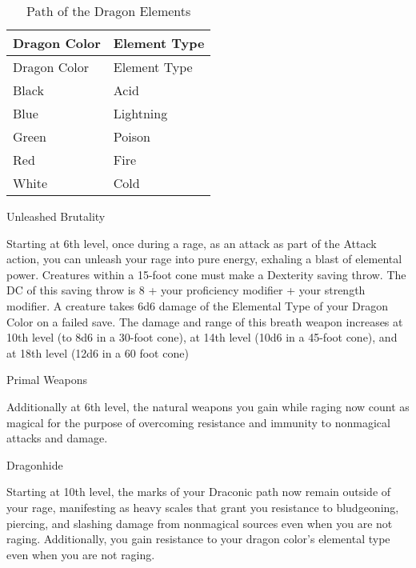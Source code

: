 \begin{longtable}[]{@{}
  >{\raggedright\arraybackslash}p{}
  >{\raggedright\arraybackslash}p{}@{}}
\caption{Path of the Dragon
Elements}\label{dreadnought-path-of-the-dragon-table}\tabularnewline
\toprule\noalign{}
\begin{minipage}[b]{\linewidth}\raggedright
Dragon Color
\end{minipage} & \begin{minipage}[b]{\linewidth}\raggedright
Element Type
\end{minipage} \\
\midrule\noalign{}
\endfirsthead
\toprule\noalign{}
\begin{minipage}[b]{\linewidth}\raggedright
Dragon Color
\end{minipage} & \begin{minipage}[b]{\linewidth}\raggedright
Element Type
\end{minipage} \\
\midrule\noalign{}
\endhead
\bottomrule\noalign{}
\endlastfoot
Black & Acid \\
Blue & Lightning \\
Green & Poison \\
Red & Fire \\
White & Cold \\
\end{longtable}

Unleashed Brutality

Starting at 6th level, once during a rage, as an attack as part of the
Attack action, you can unleash your rage into pure energy, exhaling a
blast of elemental power. Creatures within a 15-foot cone must make a
Dexterity saving throw. The DC of this saving throw is 8 + your
proficiency modifier + your strength modifier. A creature takes 6d6
damage of the Elemental Type of your Dragon Color on a failed save. The
damage and range of this breath weapon increases at 10th level (to 8d6
in a 30-foot cone), at 14th level (10d6 in a 45-foot cone), and at 18th
level (12d6 in a 60 foot cone)

Primal Weapons

Additionally at 6th level, the natural weapons you gain while raging now
count as magical for the purpose of overcoming resistance and immunity
to nonmagical attacks and damage.

Dragonhide

Starting at 10th level, the marks of your Draconic path now remain
outside of your rage, manifesting as heavy scales that grant you
resistance to bludgeoning, piercing, and slashing damage from nonmagical
sources even when you are not raging. Additionally, you gain resistance
to your dragon color's elemental type even when you are not raging.

